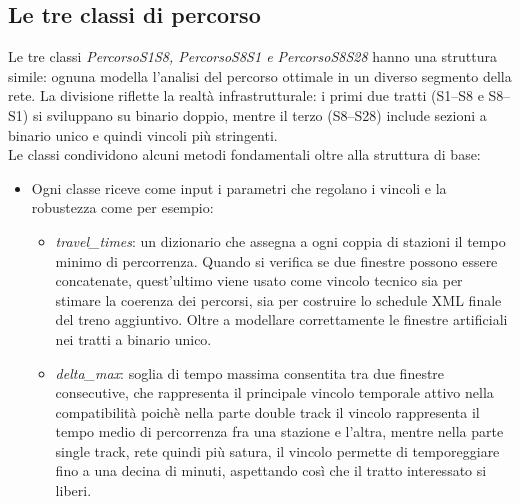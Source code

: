 \documentclass[a4paper,12pt]{report}
\begin{document}
\subsection{Le tre classi di percorso}
Le tre classi \textit{PercorsoS1S8, PercorsoS8S1 e PercorsoS8S28} hanno una struttura simile: ognuna modella l’analisi del percorso ottimale in un diverso segmento della rete.
La divisione riflette la realtà infrastrutturale: i primi due tratti (S1–S8 e S8–S1) si sviluppano su binario doppio, mentre il terzo (S8–S28) include sezioni a binario unico e quindi vincoli più stringenti.\\ Le classi condividono alcuni metodi fondamentali oltre alla struttura di base:

\begin{itemize}
    \item Ogni classe riceve come input i parametri che regolano i vincoli e la robustezza come per esempio:
    \begin{itemize}
    
        \item \textit{travel\_times}: un dizionario che assegna a ogni coppia di stazioni il tempo minimo di percorrenza. Quando si verifica se due finestre possono essere concatenate, quest'ultimo viene usato come vincolo tecnico sia per stimare la coerenza dei percorsi, sia per costruire lo schedule XML finale del treno aggiuntivo. Oltre a modellare correttamente le finestre artificiali nei tratti a binario unico.
        \item \textit{delta\_max}: soglia di tempo massima consentita tra due finestre consecutive, che rappresenta il principale vincolo temporale attivo nella compatibilità poichè nella parte double track il vincolo rappresenta il tempo medio di percorrenza fra una stazione e l'altra, mentre nella parte single track, rete quindi più satura, il vincolo permette di temporeggiare fino a una decina di minuti, aspettando così che il tratto interessato si liberi.
    \end{itemize}
    \end{itemize}
\end{document}
